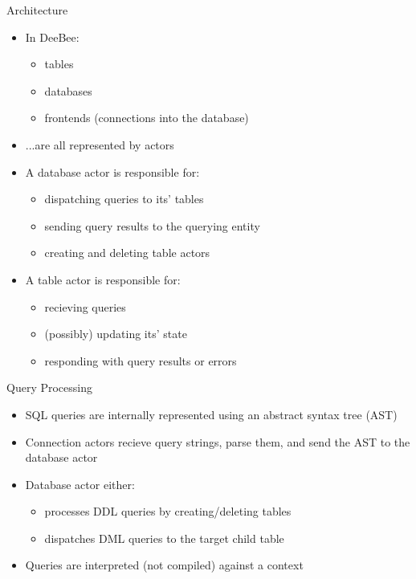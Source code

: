 \documentclass{beamer}
\begin{document}
\begin{frame}{Architecture}
  \begin{itemize}
    \item In DeeBee: \pause
    \begin{itemize}
      \item tables 
      \item databases 
      \item frontends (connections into the database)  \pause
    \end{itemize}
    \item ...are all represented by actors  \pause
    \item A database actor is responsible for:  \pause
    \begin{itemize}
      \item dispatching queries to its' tables  \pause
      \item sending query results to the querying entity  \pause
      \item creating and deleting table actors  \pause
  \end{itemize}
    \item A table actor is responsible for:  \pause
    \begin{itemize}
      \item recieving queries  \pause
      \item (possibly) updating its' state  \pause
      \item responding with query results or errors  \pause
    \end{itemize}
  \end{itemize}
\end{frame}

\begin{frame}{Query Processing}
\begin{itemize}
  \item SQL queries are internally represented using an \alert{abstract syntax tree} (AST)  \pause
  \item Connection actors recieve \alert{query strings}, parse them, and send the AST to the database actor  \pause
  \item Database actor either:  \pause
    \begin{itemize}
      \item processes DDL queries by creating/deleting tables  \pause
      \item dispatches DML queries to the target child table  \pause
    \end{itemize}
    \item Queries are \alert{interpreted} (not compiled) against a context  \pause
\end{itemize}
\end{frame}
\end{document}
